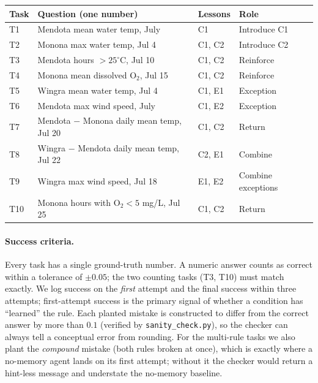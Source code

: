 \begin{center}
\begin{tabular}{llll}
\hline
\textbf{Task} & \textbf{Question (one number)} & \textbf{Lessons} & \textbf{Role} \\
\hline
T1  & Mendota mean water temp, July              & C1          & Introduce C1 \\
T2  & Monona max water temp, Jul 4               & C1, C2      & Introduce C2 \\
T3  & Mendota hours $>25^\circ$C, Jul 10         & C1, C2      & Reinforce \\
T4  & Monona mean dissolved O$_2$, Jul 15        & C1, C2      & Reinforce \\
T5  & Wingra mean water temp, Jul 4             & C1, E1      & Exception \\
T6  & Mendota max wind speed, July               & C1, E2      & Exception \\
T7  & Mendota $-$ Monona daily mean temp, Jul 20 & C1, C2      & Return \\
T8  & Wingra $-$ Mendota daily mean temp, Jul 22 & C2, E1      & Combine \\
T9  & Wingra max wind speed, Jul 18             & E1, E2      & Combine exceptions \\
T10 & Monona hours with O$_2 < 5$ mg/L, Jul 25   & C1, C2      & Return \\
\hline
\end{tabular}
\end{center}

\paragraph{Success criteria.} Every task has a single ground-truth number. A numeric
answer counts as correct within a tolerance of $\pm0.05$; the two counting tasks (T3,
T10) must match exactly. We log success on the \emph{first} attempt and the final
success within three attempts; first-attempt success is the primary signal of whether a
condition has ``learned'' the rule. Each planted mistake is constructed to differ from
the correct answer by more than $0.1$ (verified by \texttt{sanity\_check.py}), so the
checker can always tell a conceptual error from rounding. For the multi-rule tasks we
also plant the \emph{compound} mistake (both rules broken at once), which is exactly
where a no-memory agent lands on its first attempt; without it the checker would return a
hint-less message and understate the no-memory baseline.

